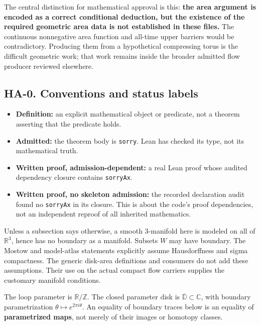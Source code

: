 \documentclass[
  letterpaper,
  11pt]{article}
\providecommand{\tightlist}{%
  \setlength{\itemsep}{0pt}\setlength{\parskip}{0pt}}
\begin{document}
The central distinction for mathematical approval is this: \textbf{the
area argument is encoded as a correct conditional deduction, but the
existence of the required geometric area data is not established in
these files.} The continuous nonnegative area function and all-time
upper barriers would be contradictory. Producing them from a
hypothetical compressing torus is the difficult geometric work; that
work remains inside the broader admitted flow producer reviewed
elsewhere.

\subsection{HA-0. Conventions and status labels}\label{ha-0}

\begin{itemize}
\tightlist
\item
  \textbf{Definition:} an explicit mathematical object or predicate, not
  a theorem asserting that the predicate holds.
\item
  \textbf{Admitted:} the theorem body is {\small\texttt{sorry}}. Lean
  has checked its type, not its mathematical truth.
\item
  \textbf{Written proof, admission-dependent:} a real Lean proof whose
  audited dependency closure contains
  {\small\texttt{sorry\allowbreak{}Ax}}.
\item
  \textbf{Written proof, no skeleton admission:} the recorded
  declaration audit found no {\small\texttt{sorry\allowbreak{}Ax}} in
  its closure. This is about the code's proof dependencies, not an
  independent reproof of all inherited mathematics.
\end{itemize}

Unless a subsection says otherwise, a smooth 3-manifold here is modeled
on all of \(\mathbb R^3\), hence has no boundary as a manifold. Subsets
\(W\) may have boundary. The Mostow and model-atlas statements
explicitly assume Hausdorffness and sigma compactness. The generic
disk-area definitions and consumers do not add these assumptions. Their
use on the actual compact flow carriers supplies the customary manifold
conditions.

The loop parameter is \(\mathbb R/\mathbb Z\). The closed parameter disk
is \(\overline{\mathbb D}\subset\mathbb C\), with boundary
parametrization \(\theta\mapsto e^{2\pi i\theta}\). An equality of
boundary traces below is an equality of \textbf{parametrized maps}, not
merely of their images or homotopy classes.
\end{document}
